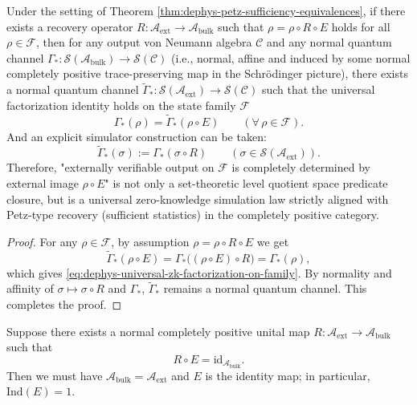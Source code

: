 \begin{corollary}\label{cor:dephys-universal-zk-simulation-factorization}
Under the setting of Theorem \ref{thm:dephys-petz-sufficiency-equivalences},
if there exists a recovery operator \(R:\mathcal{A}_{\mathrm{ext}}\to\mathcal{A}_{\mathrm{bulk}}\) such that
\(\rho=\rho\circ R\circ E\) holds for all \(\rho\in\mathcal{F}\),
then for any output von Neumann algebra \(\mathcal{C}\) and any normal quantum channel
\(\Gamma_*:\mathcal{S}(\mathcal{A}_{\mathrm{bulk}})\to\mathcal{S}(\mathcal{C})\)
(i.e., normal, affine and induced by some normal completely positive trace-preserving map in the Schr\"odinger picture),
there exists a normal quantum channel
\(\widetilde\Gamma_*:\mathcal{S}(\mathcal{A}_{\mathrm{ext}})\to\mathcal{S}(\mathcal{C})\)
such that the universal factorization identity holds on the state family \(\mathcal{F}\)
\begin{equation}\label{eq:dephys-universal-zk-factorization-on-family}
\boxed{\;
\Gamma_*(\rho)=\widetilde\Gamma_*(\rho\circ E)\qquad(\forall\,\rho\in\mathcal{F}).\;}
\end{equation}
And an explicit simulator construction can be taken:
\[
\boxed{\;
\widetilde\Gamma_*(\sigma):=\Gamma_*(\sigma\circ R)\qquad(\sigma\in\mathcal{S}(\mathcal{A}_{\mathrm{ext}})).\;}
\]
Therefore, "externally verifiable output on \(\mathcal{F}\) is completely determined by external image \(\rho\circ E\)" is not only a set-theoretic level quotient space predicate closure,
but is a universal zero-knowledge simulation law strictly aligned with Petz-type recovery (sufficient statistics) in the completely positive category.
\end{corollary}

\begin{proof}
For any \(\rho\in\mathcal{F}\), by assumption \(\rho=\rho\circ R\circ E\) we get
\[
\widetilde\Gamma_*(\rho\circ E)
=\Gamma_*\bigl((\rho\circ E)\circ R\bigr)
=\Gamma_*(\rho),
\]
which gives \eqref{eq:dephys-universal-zk-factorization-on-family}.
By normality and affinity of \(\sigma\mapsto \sigma\circ R\) and \(\Gamma_*\), \(\widetilde\Gamma_*\) remains a normal quantum channel. This completes the proof.
\end{proof}

\begin{corollary}[Full State Family Recoverability \(\Rightarrow\) Trivial Horizon: \(\mathrm{Ind}(E)=1\)]\label{cor:dephys-full-state-recovery-forces-trivial-index1}
Suppose there exists a normal completely positive unital map \(R:\mathcal{A}_{\mathrm{ext}}\to\mathcal{A}_{\mathrm{bulk}}\) such that
\begin{equation}\label{eq:dephys-left-inverse-recovery-map}
\boxed{\;R\circ E=\mathrm{id}_{\mathcal{A}_{\mathrm{bulk}}}.\;}
\end{equation}
Then we must have \(\mathcal{A}_{\mathrm{bulk}}=\mathcal{A}_{\mathrm{ext}}\) and \(E\) is the identity map;
in particular, \(\mathrm{Ind}(E)=1\).
\end{corollary}

